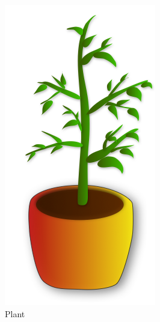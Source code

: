     \begin{figure}
      \caption{\textbf{Icon Types}
        (a) Plants represent progress.
        (b) Birds represent wellness or general status.
        (c) Hamsters represent activity or arousal.
      }
      \centering
      \begin{subfigure}[b]{0.3\textwidth}
        \includegraphics[width=.7\textwidth]{ic_plant2.png}
         \caption{Plant}
      \end{subfigure}
      \begin{subfigure}[b]{0.3\textwidth}

\end{subfigure}
\end{figure}

